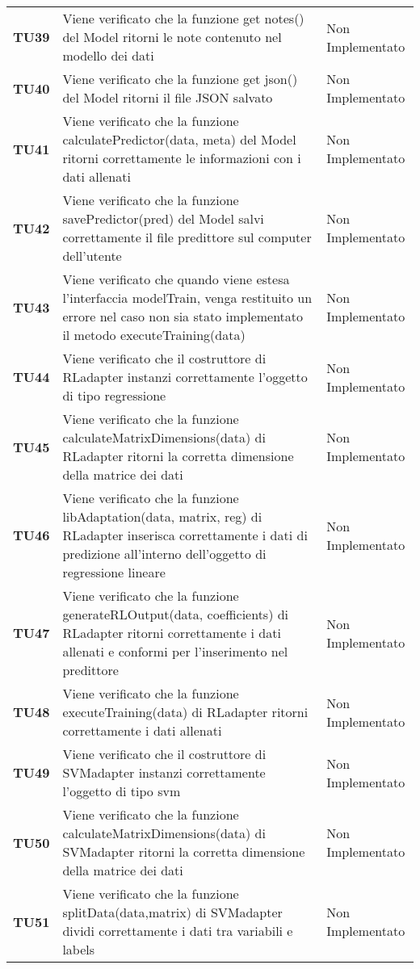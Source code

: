 \documentclass[../piano-di-qualifica.tex]{subfiles}
\begin{document}
\begin{longtable}[H]{>{\centering\bfseries}m{2.5cm} >{\centering}m{7.5cm} >{\centering\arraybackslash}m{3.5cm}}
  \textbf{TU39} & Viene verificato che la funzione get notes() del Model ritorni le note contenuto nel modello dei dati & Non Implementato \\
  \textbf{TU40} & Viene verificato che la funzione get json() del Model ritorni il file JSON salvato & Non Implementato \\
  \textbf{TU41} & Viene verificato che la funzione calculatePredictor(data, meta) del Model ritorni correttamente le informazioni con i dati allenati & Non Implementato \\
  \textbf{TU42} & Viene verificato che la funzione savePredictor(pred) del Model salvi correttamente il file predittore sul computer dell'utente & Non Implementato \\
  \textbf{TU43} & Viene verificato che quando viene estesa l'interfaccia modelTrain, venga restituito un errore nel caso non sia stato implementato il metodo executeTraining(data) & Non Implementato \\
  \textbf{TU44} & Viene verificato che il costruttore di RLadapter instanzi correttamente l'oggetto di tipo regressione & Non Implementato \\
  \textbf{TU45} & Viene verificato che la funzione calculateMatrixDimensions(data) di RLadapter ritorni la corretta dimensione della matrice dei dati & Non Implementato \\
  \textbf{TU46} & Viene verificato che la funzione libAdaptation(data, matrix, reg) di RLadapter inserisca correttamente i dati di predizione all'interno dell'oggetto di regressione lineare & Non Implementato \\
  \textbf{TU47} & Viene verificato che la funzione generateRLOutput(data, coefficients) di RLadapter ritorni correttamente i dati allenati e conformi per l'inserimento nel predittore & Non Implementato \\
  \textbf{TU48} & Viene verificato che la funzione executeTraining(data) di RLadapter ritorni correttamente i dati allenati & Non Implementato \\
  \textbf{TU49} & Viene verificato che il costruttore di SVMadapter instanzi correttamente l'oggetto di tipo svm & Non Implementato \\
  \textbf{TU50} & Viene verificato che la funzione calculateMatrixDimensions(data) di SVMadapter ritorni la corretta dimensione della matrice dei dati & Non Implementato \\
  \textbf{TU51} & Viene verificato che la funzione splitData(data,matrix) di SVMadapter dividi correttamente i dati tra variabili e labels & Non Implementato \\

\end{longtable}
\end{document}
